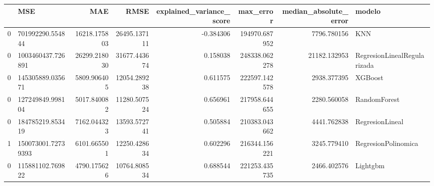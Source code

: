 \begin{tabular}{llrrrrrl}
\toprule
 & MSE & MAE & RMSE & explained_variance_score & max_error & median_absolute_error & modelo \\
\midrule
0 & 701992290.554844 & 16218.175803 & 26495.137111 & -0.384306 & 194970.687952 & 7796.780156 & KNN \\
0 & 1003460437.726891 & 26299.218030 & 31677.443674 & 0.158038 & 248338.062278 & 21182.132953 & RegresionLinealRegularizada \\
0 & 145305889.035671 & 5809.906405 & 12054.289238 & 0.611575 & 222597.142578 & 2938.377395 & XGBoost \\
0 & 127249849.998104 & 5017.840082 & 11280.507524 & 0.656961 & 217958.644655 & 2280.560058 & RandomForest \\
0 & 184785219.853419 & 7162.044323 & 13593.572741 & 0.505884 & 210383.043662 & 4441.762838 & RegresionLineal \\
1 & 150073001.72739393 & 6101.665501 & 12250.428634 & 0.602296 & 216344.156221 & 3245.779410 & RegresionPolinomica \\
0 & 115881102.769822 & 4790.175626 & 10764.808534 & 0.688544 & 221253.435735 & 2466.402576 & Lightgbm \\
\bottomrule
\end{tabular}

